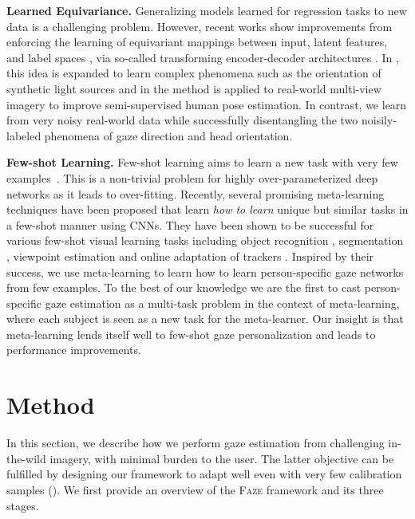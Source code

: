 \documentclass[10pt,twocolumn,letterpaper]{article}
\newcommand{\faze}[0]{\textsc{Faze}\xspace}
\newcommand{\Paragraph}[1]
{\vspace{1.5mm} \noindent \textbf{#1}}
\begin{document}
\Paragraph{Learned Equivariance.}
Generalizing models learned for regression tasks to new data is a challenging problem.
However, recent works show improvements from enforcing the learning of equivariant mappings between input, latent features, and label spaces \cite{Honari2018CVPR,Rhodin2018ECCV}, via so-called transforming encoder-decoder architectures \cite{Hinton2011ICANN}.
In \cite{Worrall2017ICCV}, this idea is expanded to learn complex phenomena such as the orientation of synthetic light sources 
and in \cite{Rhodin2018ECCV} the method is applied to real-world multi-view imagery to improve semi-supervised human pose estimation.
In contrast, we learn from very noisy real-world data while successfully disentangling the two noisily-labeled phenomena of gaze direction and head orientation.

\Paragraph{Few-shot Learning.} Few-shot learning aims to learn a new task with very few examples~\cite{lake2015human}. This is a non-trivial problem for highly over-parameterized deep networks as it leads to over-fitting. Recently, several promising meta-learning \cite{snell2017prototypical,vinyals2016matching, rezende2016oneshot,santoro2016meta, Finn2017ICML,Nichol2018:reptile,ravi2017metalstm} techniques have been proposed that learn \emph{how to learn} unique but similar tasks in a few-shot manner using CNNs. They have been shown to be successful for various few-shot visual learning tasks including object recognition \cite{Finn2017ICML}, segmentation \cite{rakelly2018few}, viewpoint estimation \cite{Tseng2019BMVC} and online adaptation of trackers \cite{park2018meta}. Inspired by their success, we use meta-learning to learn how to learn person-specific gaze networks from few examples. To the best of our knowledge we are the first to cast person-specific gaze estimation as a multi-task problem in the context of meta-learning, where each subject is seen as a new task for the meta-learner. 
Our insight is that meta-learning lends itself well to few-shot gaze personalization and leads to performance improvements.









 
\section{Method}


In this section, we describe how we perform gaze estimation from challenging in-the-wild imagery, with minimal burden to the user. The latter objective can be fulfilled by designing our framework to adapt well even with very few calibration samples ().
We first provide an overview of the  \faze framework and its three stages.
\end{document}
